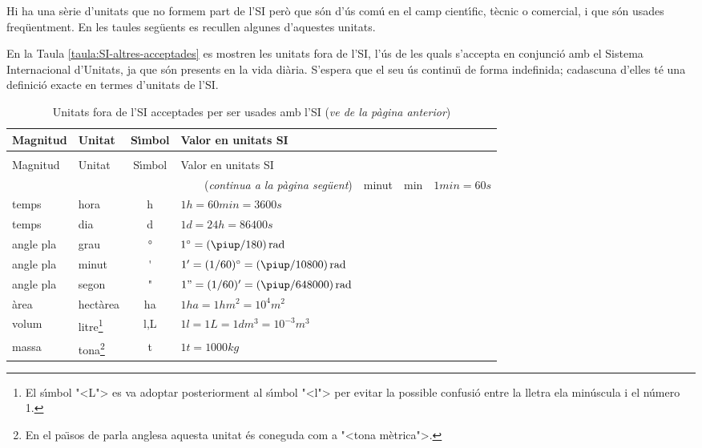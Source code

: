 Hi ha una s\`{e}rie d'unitats que no formem part de l'SI per\`{o} que s\'{o}n d'\'{u}s com\'{u} en el camp cient\'{\i}fic, t\`{e}cnic o comercial, i que s\'{o}n usades freq\"{u}entment. En les taules seg\"{u}ents es recullen algunes d'aquestes unitats.

En la Taula \vref{taula:SI-altres-acceptades} es mostren les unitats fora de l'SI, l'\'{u}s de les quals s'accepta en conjunci\'{o} amb el Sistema Internacional d'Unitats, ja que s\'{o}n presents en la vida di\`{a}ria. S'espera que el seu \'{u}s continu\"{\i} de forma indefinida; cadascuna d'elles t\'{e} una definici\'{o} exacte en termes d'unitats de l'SI.

\begin{longtable}[h]{llcl}
   \caption{\label{taula:SI-altres-acceptades} Unitats fora de l'SI acceptades per a ser usades amb l'SI  }\\
   \toprule[1pt]
    Magnitud & Unitat &  S\'{\i}mbol & Valor en unitats SI\\
   \midrule
   \endfirsthead
   \caption[]{Unitats fora de l'SI acceptades per ser usades amb l'SI (\emph{ve de la p\`{a}gina
   anterior})}\\
   \toprule[1pt]
    Magnitud & Unitat &  S\'{\i}mbol & Valor en unitats SI\\
   \midrule
   \endhead
   \midrule
   \multicolumn{4}{r}{(\emph{continua a la p\`{a}gina seg\"{u}ent})}
   \endfoot
   \endlastfoot
   temps & minut &  \unit{min}& $1\unit{min} = 60\unit{s}$ \\
   temps & hora & \unit{h} & $1\unit{h} = 60\unit{min} = 3600\unit{s}$ \\
   temps & dia & \unit{d} & $1\unit{d} = 24\unit{h} = 86400\unit{s}$\\
   angle pla & grau &  \unit{\degree} &   $1\degree = (\piup/180)\unit{rad}$ \\
   angle pla & minut & \unit{'} & $1' = (1/60)\degree = (\piup/10800)\unit{rad}$ \\
   angle pla & segon & \unit{"} & $1" = (1/60)' = (\piup/648000)\unit{rad}$ \\
   \`{a}rea & hect\`{a}rea & \unit{ha} & $1\unit{ha} = 1\unit{hm^2} = 10^4\unit{m^2}$\\
   volum & litre\footnote{El s\'{\i}mbol {"<}L{">} es va adoptar posteriorment al s\'{\i}mbol {"<}l{">} per evitar la possible confusi\'{o} entre la lletra ela min\'{u}scula i  el n\'{u}mero 1.}& \unit{l},\unit{L} & $1\unit{l} = 1\unit{L} = 1\unit{dm^3} = 10^{-3}\unit{m^3}$ \\
   massa & tona\footnote{En el pa\"{\i}sos de parla anglesa aquesta unitat \'{e}s coneguda com a {"<}tona m\`{e}trica{">}.} & \unit{t} & $1\unit{t} =1000\unit{kg}$\\
   \bottomrule[1pt]
\end{longtable}
\index{$\degree$}

